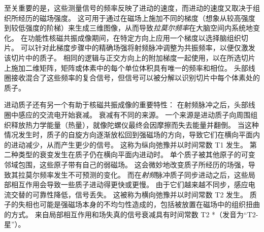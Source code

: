 至关重要的是，这些测量信号的频率反映了进动的速度，而进动的速度又取决于组织所经历的磁场强度。
这可用于通过在磁场上施加不同的梯度（想象从较高强度到较低强度的阶梯）来生成三维图像，从而导致\textit{拉莫尔频率}在大脑空间内系统地变化。
在功能性核磁共振成像期间，在特定方向上应用一个梯度以选择脑组织切片。
可以针对此梯度步骤中的精确场强将射频脉冲调整为共振频率，以便仅激发该切片中的质子。
相同的逻辑与正交方向上的附加梯度一起使用，以在所选切片上施加二维矩阵，矩阵或体素中的每个单位体积具有唯一的频率和相位。
头部线圈接收混合了这些频率的复合信号，但信号可以被分解以识别切片中每个体素处的质子。


进动质子还有另一个有助于核磁共振成像的重要特性：
在射频脉冲之后，头部线圈中感应的交流电开始衰减。
衰减有不同的来源。
一个来源是进动质子向周围组织释放热力学能量（热量），就像陀螺仪最终会因摩擦而失去能量并翻倒。
当这种情况发生时，质子的自旋方向逐渐放松回到强磁场的方向，导致它们在横向平面内的进动减少，从而产生更少的信号。
这称为纵向弛豫并以时间常数 T1 发生。
第二种类型的衰变发生在质子仍在横向平面内进动时。
单个质子被其他原子的可变邻域包围，这些原子带有自己的弱磁场。
这会微妙地改变质子所经历的场强，导致其拉莫尔频率发生不可预测的变化。
而在\textit{射频}脉冲质子同步进动之后，这些局部相互作用会导致一些质子进动得更快或更慢。
由于它们越来越不同步，感应电流交替的可靠性降低，信号丢失。
这被称为横向弛豫并以时间常数 T2 发生。 
质子的失相也可能是强磁场本身的不均匀性造成的，包括被放置在磁场中的组织扭曲的方式。
来自局部相互作用和场失真的信号衰减具有时间常数 T2 *（发音为“T2-星”）。


